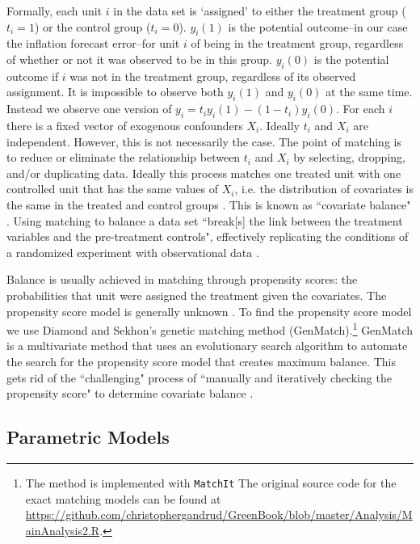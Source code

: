 \documentclass[a4paper]{article}\usepackage{graphicx, color}
\begin{document}
Formally, each unit $i$ in the data set is `assigned' to either the treatment group ($t_{i} = 1$) or the control group ($t_{i} = 0$). $y_{i}(1)$ is the potential outcome--in our case the inflation forecast error--for unit $i$ of being in the treatment group, regardless of whether or not it was observed to be in this group. $y_{i}(0)$ is the potential outcome if $i$ was not in the treatment group, regardless of its observed assignment. It is impossible to observe both $y_{i}(1)$ and $y_{i}(0)$ at the same time. Instead we observe one version of $y_{i}=t_{i}y_{i}(1)-(1-t_{i})y_i(0)$. For each $i$ there is a fixed vector of exogenous confounders $X_{i}$. Ideally $t_{i}$ and $X_{i}$ are independent. However, this is not necessarily the case. The point of matching is to reduce or eliminate the relationship between $t_{i}$  and $X_{i}$ by selecting, dropping, and/or duplicating data. Ideally this process matches one treated unit with one controlled unit that has the same values of $X_{i}$, i.e. the distribution of covariates is the same in the treated and control groups \citep{matchit2011}. This is known as ``covariate balance" \cite[1]{Diamond2012}. Using matching to balance a data set ``break[s] the link between the treatment variables and the pre-treatment controls", effectively replicating the conditions of a randomized experiment with observational data \cite[][2--3]{matchit2011}. 

Balance is usually achieved in matching through propensity scores: the probabilities that unit were assigned the treatment given the covariates. The propensity score model is generally unknown \citep{Drake1993}. To find the propensity score model we use Diamond and Sekhon's \citeyearpar{Diamond2012} genetic matching method (GenMatch).\footnote{The method is implemented with {\tt{MatchIt}} The original source code for the exact matching models can be found at {\url{https://github.com/christophergandrud/GreenBook/blob/master/Analysis/MainAnalysis2.R}}.} GenMatch is a multivariate method that uses an evolutionary search algorithm to automate the search for the propensity score model that creates maximum balance. This gets rid of the ``challenging" process of ``manually and iteratively checking the propensity score" to determine covariate balance \citep[][2]{Diamond2012}.


\subsection{Parametric Models}
\end{document}
